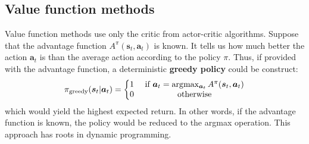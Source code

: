  
%
%
%
%
%

\subsection{Value function methods}
Value function methods use only the critic from actor-critic algorithms.
Suppose that the advantage function $ A^{ \pi } (\bm{s}_{t}, \bm{a}_{t} )  $ is known.
It tells us how much better the action $ \bm{a}_{t}  $ is than the average action
according to the policy $ \pi  $.
Thus, if provided with the advantage function, a deterministic 
\textbf{greedy policy} could be construct:
\begin{equation}
		\pi_{ \text{greedy} }(\bm{s}_{t}| \bm{a}_{t}) = \left\{ 
\begin{matrix}
		1 & \text{ if } \bm{a}_t = \arg\!\max_{\bm{a}_t} A^\pi (\bm{s}_{t}, \bm{a}_{t}) 		 \\
		0 & \text{ otherwise}
\end{matrix}
		\right.
\end{equation}
which would yield the highest expected return.
In other words, if the advantage function is known, the policy would be
reduced to the argmax operation.
This approach has roots in dynamic programming.


